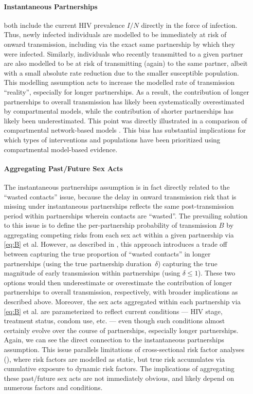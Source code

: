 \paragraph{Instantaneous Partnerships}
 both include
the current HIV prevalence $I/N$ directly in the force of infection.
Thus, newly infected individuals are modelled to be
immediately at risk of onward transmission,
including via the exact same partnership by which they were infected.
Similarly, individuals who recently transmitted to a given partner are also modelled to be
at risk of transmitting (again) to the same partner,
albeit with a small absolute rate reduction due to the smaller susceptible population.
This modelling assumption acts to increase the modelled rate of transmission \vs ``reality'',
especially for longer partnerships.
As a result, the contribution of longer partnerships to overall transmission
has likely been systematically overestimated by compartmental models,
while the contribution of shorter partnerships has likely been underestimated.
This point was directly illustrated in 
a comparison of compartmental \vs network-based models \cite{Johnson2016a}.
This bias has substantial implications for which types of interventions and populations
have been prioritized using compartmental model-based evidence.
\paragraph{Aggregating Past/Future Sex Acts}
The instantaneous partnerships assumption is in fact
directly related to the ``wasted contacts'' issue,
because the delay in onward transmission risk that is missing under instantaneous partnerships
reflects the same post-transmission period within partnerships wherein contacts are ``wasted''.
The prevailing solution to this issue is to
define the per-partnership probability of transmission $B$ by
aggregating competing risks from each sex act within a given partnership via \eqref{eq:B} et al.
However, as described in , this approach introduces a trade off between
capturing the true proportion of ``wasted contacts'' in longer partnerships
(using the true partnership duration~$\delta$)
\vs capturing the true magnitude of early transmission within partnerships (using $\delta \le 1$).
These two options would then underestimate or overestimate
the contribution of longer partnerships to overall transmission, respectively,
with broader implications as described above.
Moreover, the sex acts aggregated within each partnership via \eqref{eq:B} et al.
are parameterized to reflect current conditions
--- \ie HIV stage, treatment status, condom use, etc. ---
even though such conditions almost certainly evolve over the course of partnerships,
especially longer partnerships.
Again, we can see the direct connection to the instantaneous partnerships assumption.
This issue parallels limitations of cross-sectional risk factor analyses
(\eg {}),
where risk factors are modelled as static,
but true risk accumulates via cumulative exposure to dynamic risk factors.
The implications of aggregating these past/future sex acts are not immediately obvious,
and likely depend on numerous factors and conditions.
